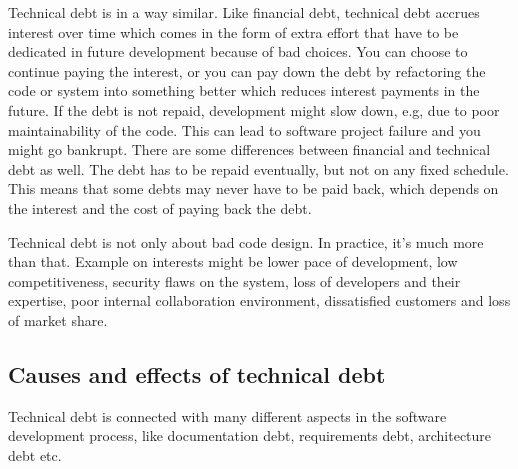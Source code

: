 Technical debt is in a way similar. Like financial debt, technical debt accrues interest over time which comes in the form of extra effort that have to be dedicated in future development because of bad choices\cite{p31-guo,p35-klinger}. You can choose to continue paying the interest, or you can pay down the debt by refactoring the code or system into something better which reduces interest payments in the future\cite{url-fowler}. If the debt is not repaid, development might slow down, e.g, due to poor maintainability of the code. This can lead to software project failure and you might go bankrupt\cite{p50-allman}. There are some differences between financial and technical debt as well. The debt has to be repaid eventually, but not on any fixed schedule\cite{p50-allman}. This means that some debts may never have to be paid back, which depends on the interest and the cost of paying back the debt\cite{foser076-brown}. 

Technical debt is not only about bad code design. In practice, it's much more than that. Example on interests might be lower pace of development, low competitiveness, security flaws on the system, loss of developers and their expertise, poor internal collaboration environment, dissatisfied customers and loss of market share\cite{p50-allman}.


\subsection{Causes and effects of technical debt}
Technical debt is connected with many different aspects in the software development process, like documentation debt, requirements debt, architecture debt etc\cite{Falessi:2015:FRI:2797433.2797462}. 

